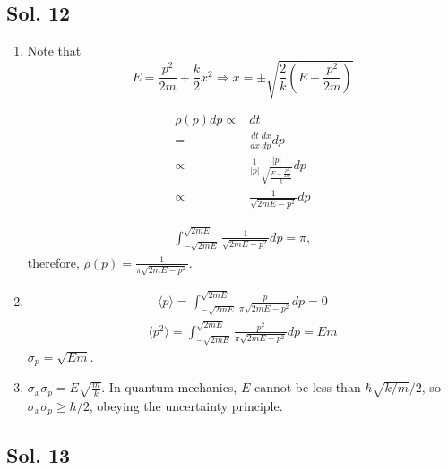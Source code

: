 \subsection*{Sol. 12}
\begin{enumerate}
    \item 
    Note that 
    $$
    E = \frac{p^2}{2m}+\frac{k}{2}x^2
    \Rightarrow 
    x = \pm\sqrt{\frac{2}{k}(E - \frac{p^2}{2m})}
    $$


\begin{align*}
    \rho(p)dp \propto & dt \\
    = &  
    \frac{dt}{dx}
    \frac{dx}{dp}
    dp \\
    \propto &  
    \frac{1}{|p|}
    \frac{|p|}{\sqrt{\frac{E - \frac{p^{2}}{2m}}{k}}}
    dp\\
    \propto & \frac{1}{\sqrt{2mE-p^2}}dp
\end{align*}


\begin{align*}
    \int_{-\sqrt{2mE}}
    ^{\sqrt{2mE}}
    \frac{1}{\sqrt{2mE-p^2}}dp = \pi,
\end{align*}
therefore, $\rho(p) = \frac{1}{\pi\sqrt{2mE-p^2}}$.
    
\item 
\begin{align*}
    \langle p \rangle
    =\int_{-\sqrt{2mE}}
    ^{\sqrt{2mE}}
    \frac{p}{\pi\sqrt{2mE-p^2}}dp = 0
\end{align*}
\begin{align*}
    \langle p^2 \rangle
    =\int_{-\sqrt{2mE}}
    ^{\sqrt{2mE}}
    \frac{p^2}{\pi\sqrt{2mE-p^2}}dp = Em
\end{align*}
$\sigma_p = \sqrt{Em}$.

\item $\sigma_x\sigma_p = E\sqrt{\frac{m}{k}}$. In quantum mechanics, $E$ cannot be less than $\hbar\sqrt{k/m}/2$, so $\sigma_x\sigma_p \geq \hbar/2$, obeying the uncertainty principle. 

    
\end{enumerate}

\subsection*{Sol. 13}

